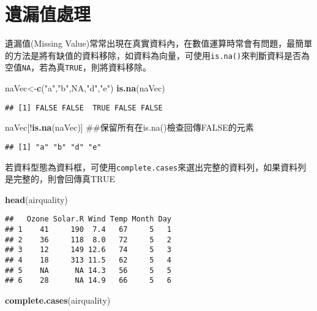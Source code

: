 \documentclass[]{book}
\newenvironment{Shaded}{\begin{snugshade}}{\end{snugshade}}
\newcommand{\KeywordTok}[1]{\textcolor[rgb]{0.13,0.29,0.53}{\textbf{{#1}}}}
\newcommand{\StringTok}[1]{\textcolor[rgb]{0.31,0.60,0.02}{{#1}}}
\newcommand{\OtherTok}[1]{\textcolor[rgb]{0.56,0.35,0.01}{{#1}}}
\newcommand{\NormalTok}[1]{{#1}}
\begin{document}
\section{遺漏值處理}

遺漏值(Missing
Value)常常出現在真實資料內，在數值運算時常會有問題，最簡單的方法是將有缺值的資料移除，如資料為向量，可使用\texttt{is.na()}來判斷資料是否為空值\texttt{NA}，若為真\texttt{TRUE}，則將資料移除。

\begin{Shaded}
\begin{Highlighting}[]
\NormalTok{naVec<-}\KeywordTok{c}\NormalTok{(}\StringTok{"a"}\NormalTok{,}\StringTok{"b"}\NormalTok{,}\OtherTok{NA}\NormalTok{,}\StringTok{"d"}\NormalTok{,}\StringTok{"e"}\NormalTok{)}
\KeywordTok{is.na}\NormalTok{(naVec)}
\end{Highlighting}
\end{Shaded}

\begin{verbatim}
## [1] FALSE FALSE  TRUE FALSE FALSE
\end{verbatim}

\begin{Shaded}
\begin{Highlighting}[]
\NormalTok{naVec[!}\KeywordTok{is.na}\NormalTok{(naVec)] ##保留所有在is.na()檢查回傳FALSE的元素}
\end{Highlighting}
\end{Shaded}

\begin{verbatim}
## [1] "a" "b" "d" "e"
\end{verbatim}

若資料型態為資料框，可使用\texttt{complete.cases}來選出完整的資料列，如果資料列是完整的，則會回傳真TRUE

\begin{Shaded}
\begin{Highlighting}[]
\KeywordTok{head}\NormalTok{(airquality)}
\end{Highlighting}
\end{Shaded}

\begin{verbatim}
##   Ozone Solar.R Wind Temp Month Day
## 1    41     190  7.4   67     5   1
## 2    36     118  8.0   72     5   2
## 3    12     149 12.6   74     5   3
## 4    18     313 11.5   62     5   4
## 5    NA      NA 14.3   56     5   5
## 6    28      NA 14.9   66     5   6
\end{verbatim}

\begin{Shaded}
\begin{Highlighting}[]
\KeywordTok{complete.cases}\NormalTok{(airquality) }
\end{Highlighting}
\end{Shaded}
\end{document}
